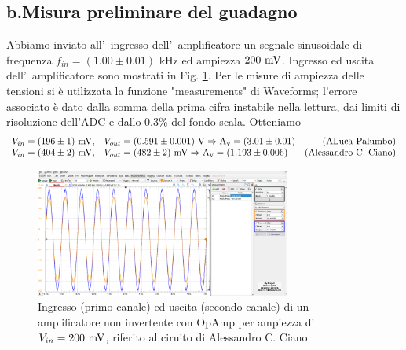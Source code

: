 \documentclass[10pt,a4paper]{article}
\begin{document}
\subsection*{b.Misura preliminare del guadagno}
Abbiamo inviato all'~ingresso dell'~amplificatore un segnale sinusoidale di frequenza $f_{in} = (1.00 \pm 0.01)$ kHz ed 
ampiezza $200\ \rm mV$. Ingresso ed uscita dell'~amplificatore sono mostrati in Fig. \ref{fig:oscnoninv}. Per le misure di ampiezza delle tensioni si è utilizzata la funzione "measurements" di Waveforms; l'errore associato è dato dalla somma della prima cifra instabile nella lettura, dai limiti di risoluzione dell'ADC e dallo 0.3\% del fondo scala. Otteniamo
\[
\begin{array}{llr}
V_{in} = (196  \pm 1) \ \rm mV,& V_{out} = (0.591 \pm 0.001) \ \rm V \Rightarrow A_v = ( 3.01 \pm 0.01) & \mbox{(ALuca Palumbo)}\\
V_{in} = (404 \pm 2) \ \rm mV, & V_{out} = ( 482 \pm 2) \ \rm mV \Rightarrow A_v = ( 1.193 \pm 0.006 ) & \mbox{(Alessandro C. Ciano)}
\end{array}
\]
%
\begin{figure}[h]
\begin{center}
\includegraphics[width=0.75\textwidth]{oscilloscopio1.png}
\end{center}
\caption{\small Ingresso (primo canale) ed uscita (secondo canale) di un amplificatore non 
invertente con OpAmp per ampiezza di $V_{in}=200\ \rm mV$, riferito al ciruito di Alessandro C. Ciano}
\label{fig:oscnoninv}
\end{figure}
%
\end{document}

